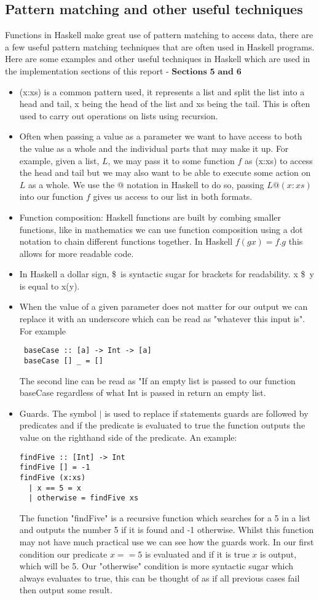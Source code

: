 \documentclass{article}%
\begin{document}
\subsection{Pattern matching and other useful techniques}
Functions in Haskell make great use of pattern matching to access data, there are a few useful pattern matching techniques that are often used in Haskell programs. Here are some examples and other useful techniques in Haskell which are used in the implementation sections of this report - $\textbf{Sections 5 and 6}$ 
\begin{itemize}
\item (x:xs) is a common pattern used, it represents a list and split the list into a head and tail, x being the head of the list and xs being the tail. This is often used to carry out operations on lists using recursion. 
\item Often when passing a value as a parameter we want to have access to both the value as a whole and the individual parts that may make it up. For example, given a list, $L$, we may pass it to some function $f$ as (x:xs) to access the head and tail but we may also want to be able to execute some action on $L$ as a whole. We use the @ notation in Haskell to do so, passing $L@(x:xs)$ into our function $f$ gives us access to our list in both formats. 
\item Function composition: Haskell functions are built by combing smaller functions, like in mathematics we can use function composition using a dot notation to chain different functions together. In Haskell $f (g x) = f . g $ this allows for more readable code. 
\item In Haskell a dollar sign, \$\ is syntactic sugar for brackets for readability. x \$\ y is equal to x(y).
\item When the value of a given parameter does not matter for our output we can replace it with an underscore which can be read as "whatever this input is". For example
\begin{verbatim}
 baseCase :: [a] -> Int -> [a] 
 baseCase [] _ = [] 
\end{verbatim}
The second line can be read as "If an empty list is passed to our function baseCase regardless of what Int is passed in return an empty list.
\item Guards. The symbol $\vert$ is used to replace if statements guards are followed by predicates and if the predicate is evaluated to true the function outputs the value on the righthand side of the predicate. An example: 
\begin{verbatim}
findFive :: [Int] -> Int 
findFive [] = -1
findFive (x:xs) 
  | x == 5 = x
  | otherwise = findFive xs 
\end{verbatim}
The function "findFive" is a recursive function which searches for a 5 in a list and outputs the number 5 if it is found and -1 otherwise. Whilst this function may not have much practical use we can see how the guards work. In our first condition our predicate $x==5$ is evaluated and if it is true $x$ is output, which will be 5. Our "otherwise" condition is more syntactic sugar which always evaluates to true, this can be thought of as if all previous cases fail then output some result. 
\end{itemize}
\end{document}
